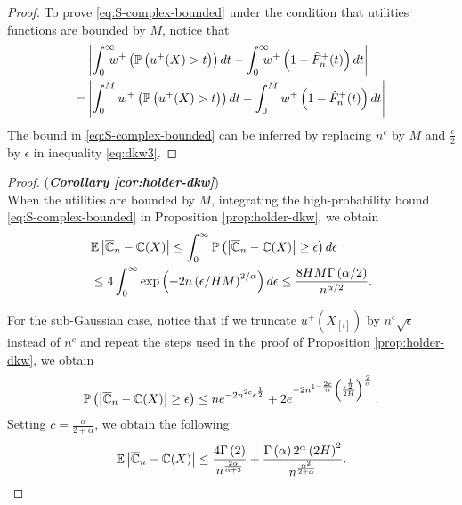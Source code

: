 \begin{proof}
To prove \eqref{eq:S-complex-bounded} under the condition that utilities functions are bounded by $M$, notice that
\begin{align*}
&\left|\int_0^{\infty}\!\!\!\! w^+\left(\Prob{u^+(X)>t}\right) dt- \int_0^{\infty} \!\!\!\! w^+\left(1- {\hat F^+_n}(t)\right) dt\right| \\ = &
    \left|\int_0^{M} w^+\left(\Prob{u^+(X)>t}\right) dt- \int_0^{M} w^+\left(1- {\hat F^+_n}(t)\right) dt\right|
\end{align*}
The  bound in \eqref{eq:S-complex-bounded} can be inferred by replacing $n^c$ by $M$ and $\frac{\epsilon}{2}$ by $\epsilon$ in inequality \eqref{eq:dkw3}.
\end{proof}

\begin{proof}(\textbf{\textit{Corollary \ref{cor:holder-dkw}}})\ \\
 When the utilities are bounded by $M$, integrating the high-probability bound \eqref{eq:S-complex-bounded} in Proposition \ref{prop:holder-dkw}, we obtain
 \begin{align}
& \mathbb{E} \left|\overline {\mathbb{C}}_n- \mathbb{C}(X) \right|  
  \le \int_0^{\infty} \mathbb{P}\left( \left|\overline {\mathbb{C}}_n- \mathbb{C}(X) \right| \geq  \epsilon \right) d\epsilon\nonumber\\
  &\le 4 \int_0^{\infty} \exp\left(-2n\left(\epsilon/HM\right)^{2/\alpha}\right) d\epsilon \le \frac{8HM \Gamma\left(\alpha/2\right)}{n^{\alpha/2}}.\label{eq:cor12-bd}
 \end{align}

For the sub-Gaussian case, notice that if we truncate $u^+\left(X_{[i]}\right)$  by $n^c\sqrt{\epsilon}$ instead of $n^c$ and repeat the steps used in the proof of Proposition
\ref{prop:holder-dkw}, we obtain
$$
\mathbb{P}\left( \left|\overline {\mathbb{C}}_n- \mathbb{C}(X) \right| \geq  \epsilon \right) \leq n e^{-2n^{2c}\epsilon^{\frac{1}{2}}} 
+ 2 e^{-2n^{1-\frac{2c}{\alpha}}\left(\frac{\epsilon^{\frac{1}{2}}}{2H}\right)^{\frac{2}{\alpha}}}\,.
$$
Setting $c=\frac{\alpha}{2+\alpha}$,
we obtain the following:
$$\mathbb{E} \left|\overline {\mathbb{C}}_n- \mathbb{C}(X) \right| \le \frac{4 \Gamma\left(2\right)}{n^{\frac{2\alpha}{\alpha+2}}} + \frac{\Gamma\left(\alpha\right)2^\alpha \left(2H\right)^{2}}{n^{\frac{\alpha^2}{2+\alpha}}}.$$
\end{proof}

